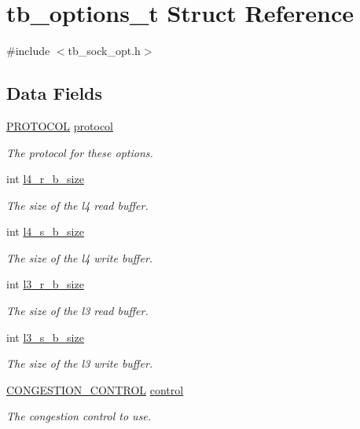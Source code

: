 \hypertarget{structtb__options__t}{\section{tb\-\_\-options\-\_\-t Struct Reference}
\label{structtb__options__t}
}


{\ttfamily \#include $<$tb\-\_\-sock\-\_\-opt.\-h$>$}

\subsection*{Data Fields}
\begin{DoxyCompactItemize}
\item 
\hyperlink{tb__protocol_8h_a7a5bff1040fc154c510874327d44cc1a}{P\-R\-O\-T\-O\-C\-O\-L} \hyperlink{structtb__options__t_a0d2276cd987e688180eedab183cd503e}{protocol}
\begin{DoxyCompactList}\small\item\em The protocol for these options. \end{DoxyCompactList}\item 
int \hyperlink{structtb__options__t_a8ae9ae9a85fbb77bc460b0d43e4fc1c5}{l4\-\_\-r\-\_\-b\-\_\-size}
\begin{DoxyCompactList}\small\item\em The size of the l4 read buffer. \end{DoxyCompactList}\item 
int \hyperlink{structtb__options__t_a6268133bba17dfd731065a164705d0c7}{l4\-\_\-s\-\_\-b\-\_\-size}
\begin{DoxyCompactList}\small\item\em The size of the l4 write buffer. \end{DoxyCompactList}\item 
int \hyperlink{structtb__options__t_aa9d1ab0c9c6ef33a4b6bd60172dd0ec5}{l3\-\_\-r\-\_\-b\-\_\-size}
\begin{DoxyCompactList}\small\item\em The size of the l3 read buffer. \end{DoxyCompactList}\item 
int \hyperlink{structtb__options__t_a5e71f50be7927448ed7d21d809361fec}{l3\-\_\-s\-\_\-b\-\_\-size}
\begin{DoxyCompactList}\small\item\em The size of the l3 write buffer. \end{DoxyCompactList}\item 
\hyperlink{tb__protocol_8h_ac5355051296d54a114b8691ccfc4010c}{C\-O\-N\-G\-E\-S\-T\-I\-O\-N\-\_\-\-C\-O\-N\-T\-R\-O\-L} \hyperlink{structtb__options__t_a50b4d1da7c10bfd1e9365a1c37d09442}{control}
\begin{DoxyCompactList}\small\item\em The congestion control to use. \end{DoxyCompactList}\end{DoxyCompactItemize}


